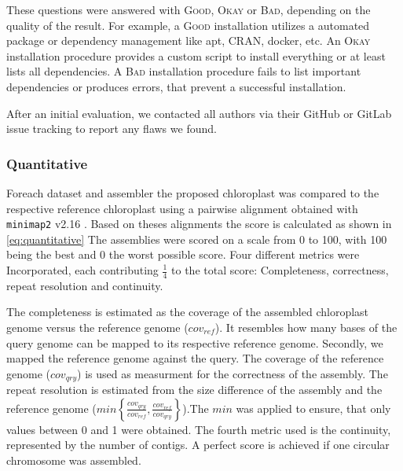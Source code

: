 \documentclass{bmcart}
\newcommand{\ok}{\textsc{Okay}}
\newcommand{\bad}{\textsc{Bad}}
\newcommand{\good}{\textsc{Good}}
\begin{document}
These questions were answered with \good{}, \ok{} or \bad{}, depending on the quality of the result. 
For example, a \good{} installation utilizes a automated package or dependency management like apt,
CRAN, docker, etc. An \ok{} installation procedure provides a custom script to install everything
or at least lists all dependencies. A \bad{} installation procedure fails to list important dependencies
or produces errors, that prevent a successful installation. 

After an initial evaluation, we contacted all authors via their GitHub or GitLab issue tracking to
report any flaws we found.

\subsubsection*{Quantitative}

%



Foreach dataset and assembler the proposed chloroplast was compared to the respective reference chloroplast using a pairwise alignment obtained with \texttt{minimap2} v2.16 \cite{li2018minimap2}. Based on theses alignments the score is calculated as shown in \cref{eq:quantitative}
The assemblies were scored on a scale from 0 to 100, with 100 being the best and 0 the worst possible score. Four different metrics were Incorporated, each contributing  $\frac{1}{4}$ to the total score: Completeness, correctness, repeat resolution and continuity.

The completeness is estimated as the coverage of the assembled chloroplast genome versus the reference genome ($cov_{ref}$). It resembles how many bases of the query genome can be mapped to its respective reference genome. Secondly, we mapped the reference genome against the query. The coverage of the reference genome ($cov_{qry}$) is used as measurment for the correctness of the assembly. The repeat resolution is estimated from the size difference of the assembly and the reference genome ($min\left\{ \frac{cov_{qry}}{cov_{ref}}, \frac{cov_{ref}}{cov_{qry}}\right\}$).The $min$ was applied to ensure, that only values between 0 and 1 were obtained. The fourth metric used is the continuity, represented by the number of contigs. A perfect score is achieved if one circular chromosome was assembled.
\end{document}
